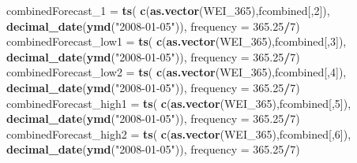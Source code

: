 \documentclass[]{article}
\newenvironment{Shaded}{\begin{snugshade}}{\end{snugshade}}
\newcommand{\KeywordTok}[1]{\textcolor[rgb]{0.13,0.29,0.53}{\textbf{#1}}}
\newcommand{\DataTypeTok}[1]{\textcolor[rgb]{0.13,0.29,0.53}{#1}}
\newcommand{\DecValTok}[1]{\textcolor[rgb]{0.00,0.00,0.81}{#1}}
\newcommand{\FloatTok}[1]{\textcolor[rgb]{0.00,0.00,0.81}{#1}}
\newcommand{\StringTok}[1]{\textcolor[rgb]{0.31,0.60,0.02}{#1}}
\newcommand{\OperatorTok}[1]{\textcolor[rgb]{0.81,0.36,0.00}{\textbf{#1}}}
\newcommand{\NormalTok}[1]{#1}
\begin{document}
\begin{Shaded}
\begin{Highlighting}[]
\NormalTok{combinedForecast_}\DecValTok{1}\NormalTok{ =}\StringTok{ }\KeywordTok{ts}\NormalTok{( }\KeywordTok{c}\NormalTok{(}\KeywordTok{as.vector}\NormalTok{(WEI_}\DecValTok{365}\NormalTok{),fcombined[,}\DecValTok{2}\NormalTok{]),}
                         \KeywordTok{decimal_date}\NormalTok{(}\KeywordTok{ymd}\NormalTok{(}\StringTok{"2008-01-05"}\NormalTok{)), }\DataTypeTok{frequency =} \FloatTok{365.25}\OperatorTok{/}\DecValTok{7}\NormalTok{)}
\NormalTok{combinedForecast_low1 =}\StringTok{ }\KeywordTok{ts}\NormalTok{( }\KeywordTok{c}\NormalTok{(}\KeywordTok{as.vector}\NormalTok{(WEI_}\DecValTok{365}\NormalTok{),fcombined[,}\DecValTok{3}\NormalTok{]), }
                            \KeywordTok{decimal_date}\NormalTok{(}\KeywordTok{ymd}\NormalTok{(}\StringTok{"2008-01-05"}\NormalTok{)), }\DataTypeTok{frequency =} \FloatTok{365.25}\OperatorTok{/}\DecValTok{7}\NormalTok{)}
\NormalTok{combinedForecast_low2 =}\StringTok{ }\KeywordTok{ts}\NormalTok{( }\KeywordTok{c}\NormalTok{(}\KeywordTok{as.vector}\NormalTok{(WEI_}\DecValTok{365}\NormalTok{),fcombined[,}\DecValTok{4}\NormalTok{]),}
                            \KeywordTok{decimal_date}\NormalTok{(}\KeywordTok{ymd}\NormalTok{(}\StringTok{"2008-01-05"}\NormalTok{)), }\DataTypeTok{frequency =} \FloatTok{365.25}\OperatorTok{/}\DecValTok{7}\NormalTok{)}
\NormalTok{combinedForecast_high1 =}\StringTok{ }\KeywordTok{ts}\NormalTok{( }\KeywordTok{c}\NormalTok{(}\KeywordTok{as.vector}\NormalTok{(WEI_}\DecValTok{365}\NormalTok{),fcombined[,}\DecValTok{5}\NormalTok{]),}
                             \KeywordTok{decimal_date}\NormalTok{(}\KeywordTok{ymd}\NormalTok{(}\StringTok{"2008-01-05"}\NormalTok{)), }\DataTypeTok{frequency =} \FloatTok{365.25}\OperatorTok{/}\DecValTok{7}\NormalTok{)}
\NormalTok{combinedForecast_high2 =}\StringTok{ }\KeywordTok{ts}\NormalTok{( }\KeywordTok{c}\NormalTok{(}\KeywordTok{as.vector}\NormalTok{(WEI_}\DecValTok{365}\NormalTok{),fcombined[,}\DecValTok{6}\NormalTok{]),}
                             \KeywordTok{decimal_date}\NormalTok{(}\KeywordTok{ymd}\NormalTok{(}\StringTok{"2008-01-05"}\NormalTok{)), }\DataTypeTok{frequency =} \FloatTok{365.25}\OperatorTok{/}\DecValTok{7}\NormalTok{)}


\end{Highlighting}
\end{Shaded}
\end{document}
